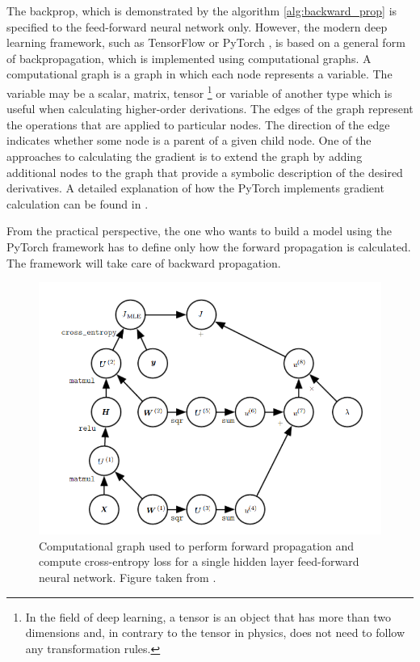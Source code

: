 The backprop, which is demonstrated by the algorithm \ref{alg:backward_prop} is specified to the feed-forward neural network only. However, the modern deep learning framework, such as TensorFlow \cite{tensorflow} or PyTorch \cite{pytorch}, is based on a general form of backpropagation, which is implemented using computational graphs. 
A computational graph is a graph in which each node represents a variable. The variable may be a scalar, matrix,  tensor \footnote{In the field of deep learning, a tensor is an object that has more than two dimensions and, in contrary to the tensor in physics, does not need to follow any transformation rules.} or variable of another type which is useful when calculating higher-order derivations.    
The edges of the graph represent the operations that are applied to particular nodes. The direction of the edge indicates whether some node is a parent of a given child node. 
One of the approaches to calculating the gradient is to extend the graph by adding additional nodes to the graph that provide a symbolic description of the desired derivatives. A detailed explanation of how the PyTorch implements gradient calculation can be found in \cite{autograd}. 

From the practical perspective, the one who wants to build a model using the PyTorch framework has to define only how the forward propagation is calculated. The framework will take care of backward propagation.

\begin{figure}[!ht]
\centering
\includegraphics[scale=0.7]{figures/Comput_graph.PNG}
\caption{Computational graph used to perform forward propagation and compute cross-entropy loss for a single hidden layer feed-forward neural network. Figure taken from \cite{DLBook}.
}
\label{fig:Comput_graph}
\end{figure} 

